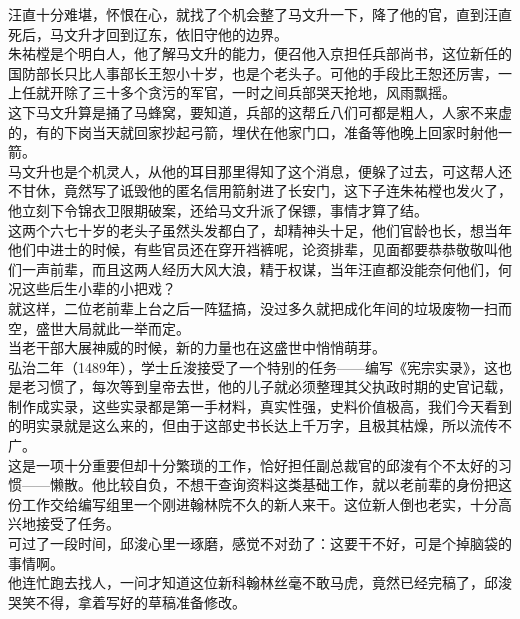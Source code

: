 \begin{multicols}{\theparacolNo}
汪直十分难堪，怀恨在心，就找了个机会整了马文升一下，降了他的官，直到汪直死后，马文升才回到辽东，依旧守他的边界。\\

朱祐樘是个明白人，他了解马文升的能力，便召他入京担任兵部尚书，这位新任的国防部长只比人事部长王恕小十岁，也是个老头子。可他的手段比王恕还厉害，一上任就开除了三十多个贪污的军官，一时之间兵部哭天抢地，风雨飘摇。\\

这下马文升算是捅了马蜂窝，要知道，兵部的这帮丘八们可都是粗人，人家不来虚的，有的下岗当天就回家抄起弓箭，埋伏在他家门口，准备等他晚上回家时射他一箭。\\

马文升也是个机灵人，从他的耳目那里得知了这个消息，便躲了过去，可这帮人还不甘休，竟然写了诋毁他的匿名信用箭射进了长安门，这下子连朱祐樘也发火了，他立刻下令锦衣卫限期破案，还给马文升派了保镖，事情才算了结。\\

这两个六七十岁的老头子虽然头发都白了，却精神头十足，他们官龄也长，想当年他们中进士的时候，有些官员还在穿开裆裤呢，论资排辈，见面都要恭恭敬敬叫他们一声前辈，而且这两人经历大风大浪，精于权谋，当年汪直都没能奈何他们，何况这些后生小辈的小把戏？\\

就这样，二位老前辈上台之后一阵猛搞，没过多久就把成化年间的垃圾废物一扫而空，盛世大局就此一举而定。\\

当老干部大展神威的时候，新的力量也在这盛世中悄悄萌芽。\\

弘治二年（1489年），学士丘浚接受了一个特别的任务——编写《宪宗实录》，这也是老习惯了，每次等到皇帝去世，他的儿子就必须整理其父执政时期的史官记载，制作成实录，这些实录都是第一手材料，真实性强，史料价值极高，我们今天看到的明实录就是这么来的，但由于这部史书长达上千万字，且极其枯燥，所以流传不广。\\

这是一项十分重要但却十分繁琐的工作，恰好担任副总裁官的邱浚有个不太好的习惯——懒散。他比较自负，不想干查询资料这类基础工作，就以老前辈的身份把这份工作交给编写组里一个刚进翰林院不久的新人来干。这位新人倒也老实，十分高兴地接受了任务。\\

可过了一段时间，邱浚心里一琢磨，感觉不对劲了：这要干不好，可是个掉脑袋的事情啊。\\

他连忙跑去找人，一问才知道这位新科翰林丝毫不敢马虎，竟然已经完稿了，邱浚哭笑不得，拿着写好的草稿准备修改。\\


\end{multicols}
